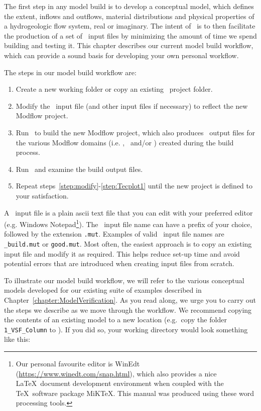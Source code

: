 \label{chapter:ModelBuild}
The first step in any model build is to develop a conceptual model, which defines the extent, inflows and outflows, material distributions and physical properties of a hydrogeologic flow system, real or imaginary. The intent of \mut\ is to then facilitate the production of a set of \mfus\ input files by minimizing the amount of time we spend building and testing it.  This chapter describes our current model build workflow, which can provide a sound basis for developing your own personal workflow.

The steps in our model build workflow are:
\begin{enumerate}
    \item Create a new working folder or copy an existing \mut\ project folder. \label{step:copy}
    \item Modify the \mut\ input file (and other input files if necessary) to reflect the new Modflow project.\label{step:modify}
    \item Run \mut\ to build the new Modflow project, which also produces \tecplot\ output files for the various Modflow domains (i.e. \gwf, \swf\ and/or \cln ) created during the build process. \label{step:mut1}
    \item Run \tecplot\ and examine the build output files.   \label{step:Tecplot1}
    \item Repeat steps~\ref{step:modify}-\ref{step:Tecplot1} until the new project is defined to your satisfaction.
\end{enumerate}

A \mut\ input file is a plain ascii text file that you can edit with your preferred editor (e.g. Windows Notepad\footnote{Our personal favourite editor is WinEdt (\url{https://www.winedt.com/snap.html}), which also provides a nice \LaTeX\ document development environment when coupled with the \TeX\ software package MiKTeX.  This manual was produced using these word processing tools.}).
The \mut\ input file name can have a prefix of your choice, followed by the extension \texttt{.mut}. Examples of valid \mut\ input file names are \texttt{\_build.mut} or \texttt{good.mut}. Most often, the easiest approach is to copy an existing input file and modify it as required.  This helps reduce set-up time and avoid potential errors that are introduced when creating input files from scratch.

To illustrate our model build workflow, we will refer to the various conceptual models developed for our existing suite of examples described in  Chapter~\ref{chapter:ModelVerification}.  As you read along, we urge you to carry out the steps we describe as we move through the workflow.  We recommend copying the contents of an existing model to a new location (e.g.\ copy the folder \texttt{1\_VSF\_Column} to ).
\pagebreak
If you did so, your working directory would look something like this:

